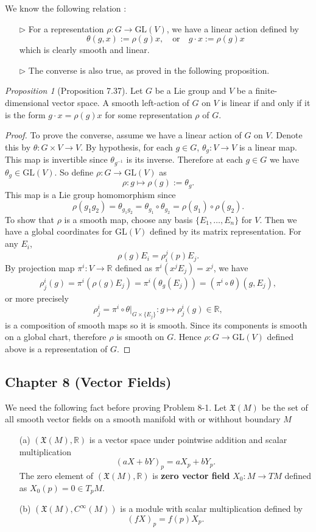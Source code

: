\documentclass[a4paper]{article}
\theoremstyle{remark}
\newtheorem{prop}{Proposition}
\newcommand{\er}{\mathbb{R}} %
\newcommand{\GLV}{\text{GL}(V)} %
\begin{document}
We know the following relation :
\begin{enumerate}[nolistsep]
\item[$\triangleright$] For a representation $\rho : G \to \GLV$, we have a linear action defined by
$$
\theta (g,x) := \rho(g)x, \quad \text{or} \quad g \cdot x := \rho(g)x
$$ 
which is clearly smooth and linear.
\item[$\triangleright$] The converse is also true, as proved in the following proposition.
\end{enumerate}
\begin{prop}[Proposition 7.37]
Let $G$ be a Lie group and $V$ be a finite-dimensional vector space. A smooth left-action of $G$ on $V$ is linear if and only if it is the form $g\cdot x = \rho(g)x$ for some representation $\rho$ of $G$.
\end{prop}
\begin{proof}
To prove the converse, assume we have a linear action of $G$ on $V$. Denote this by $\theta : G \times V \to V$. By hypothesis, for each $g \in G$, $\theta_g : V \to V$ is a linear map. This map is invertible since $\theta_{g^{-1}}$ is its inverse. Therefore at each $g \in G$ we have $\theta_g \in \GLV$. So define $\rho : G \to \GLV$ as
$$
\rho : g \mapsto \rho(g) := \theta_g.
$$
This map is a Lie group homomorphism since
$$
\rho(g_1g_2) = \theta_{g_1g_2} = \theta_{g_1} \circ \theta_{g_2} = \rho(g_1) \circ \rho(g_2).
$$
To show that $\rho$ is a smooth map, choose any basis $\{E_1,\dots,E_n\}$ for $V$. Then we have a global coordinates for $\GLV$ defined by its matrix representation. For any $E_i$, 
$$
\rho(g) E_i = \rho^j_i(p) E_j.
$$
By projection map $\pi^i : V \to \er$ defined as $\pi^i(x^jE_j) = x^j$, we have
\begin{align*}
\rho^i_j(g) = \pi^i (\rho(g)E_j) = \pi^i (\theta_g (E_j)) = (\pi^i \circ \theta) (g,E_j),
\end{align*} 
or more precisely
$$
\rho^i_j = \pi^i \circ \theta|_{G \times \{E_j\}} : g \mapsto \rho^i_j(g) \in \er,
$$
is a composition of smooth maps so it is smooth. Since its components is smooth on a global chart, therefore $\rho$ is smooth on $G$. Hence $\rho : G \to \GLV$ defined above is a representation of $G$.
\end{proof}

\subsection{Chapter 8 (Vector Fields)}

We need the following fact before proving Problem 8-1. Let $\mathfrak{X}(M)$ be the set of all smooth vector fields on a smooth manifold with or withhout boundary $M$
\begin{enumerate}
\item[(a)] $(\mathfrak{X}(M), \er)$ is a vector space under pointwise addition and scalar multiplication
$$
(aX + b Y)_p = aX_p + b Y_p.
$$
The zero element of $(\mathfrak{X}(M), \er)$ is \textbf{zero vector field} $X_0 : M \to TM$ defined as $X_0(p) = 0 \in T_pM$.
\item[(b)] $(\mathfrak{X}(M), C^{\infty}(M))$ is a module with scalar multiplication defined by 
$$
(fX)_p = f(p)X_p.
$$
\end{enumerate}
\end{document}
